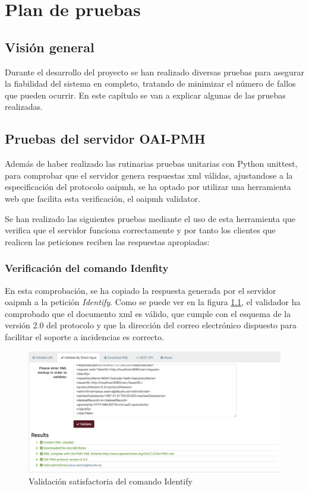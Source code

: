 \chapter{Plan de pruebas}

\section{Visión general}

Durante el desarrollo del proyecto se han realizado diversas pruebas para asegurar la fiabilidad del sistema en completo, tratando de minimizar el número de fallos que pueden ocurrir. En este capítulo se van a explicar algunas de las pruebas realizadas.

\section{Pruebas del servidor OAI-PMH}

Además de haber realizado las rutinarias pruebas unitarias con Python unittest\cite{UnitTest}, para comprobar que el servidor genera respuestas \acrshort{xml} válidas, ajustandose a la especificación del protocolo \acrshort{oaipmh}, se ha optado por utilizar una herramienta web que facilita esta verificación, el \acrshort{oaipmh} validator.

Se han realizado las siguientes pruebas mediante el uso de esta herramienta que verifica que el servidor funciona correctamente y por tanto los clientes que realicen las peticiones reciben las respuestas apropiadas:

\subsection{Verificación del comando Idenfity}

En esta comprobación, se ha copiado la respuesta generada por el servidor \acrshort{oaipmh} a la petición \textit{Identify}. Como se puede ver en la figura \ref{fig:identify}, el validador ha comprobado que el documento \acrshort{xml} es válido, que cumple con el esquema de la versión 2.0 del protocolo y que la dirección del correo electrónico dispuesto para facilitar el soporte a incidencias es correcto.

\begin{figure}[!htbp]
	\centering
	\includegraphics[scale=0.32]{fig/oaipmh_validations/Identify}
	\caption{Validación satisfactoria del comando Identify}
	\label{fig:identify}
\end{figure}

